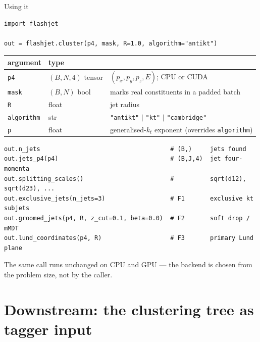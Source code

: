 \documentclass[aspectratio=169,10pt]{beamer}
\newcommand{\smallnote}[1]{{\footnotesize\color{fjgray} #1}}
\begin{document}
\begin{frame}[fragile]{Using it}
\begin{Verbatim}[fontsize=\footnotesize,frame=single,rulecolor=\color{fjgray}]
import flashjet

out = flashjet.cluster(p4, mask, R=1.0, algorithm="antikt")
\end{Verbatim}
\vspace{-0.3em}
{\footnotesize
\begin{tabular}{@{}lll@{}}
\toprule
\textbf{argument} & \textbf{type} & \\
\midrule
\texttt{p4} & $(B,N,4)$ tensor & $(p_x,p_y,p_z,E)$; CPU or CUDA\\
\texttt{mask} & $(B,N)$ bool & marks real constituents in a padded batch\\
\texttt{R} & float & jet radius\\
\texttt{algorithm} & str & \texttt{"antikt"} $\vert$ \texttt{"kt"} $\vert$ \texttt{"cambridge"}\\
\texttt{p} & float & generalised-$k_t$ exponent (overrides \texttt{algorithm})\\
\bottomrule
\end{tabular}}
\medskip

\begin{Verbatim}[fontsize=\footnotesize,frame=single,rulecolor=\color{fjgray}]
out.n_jets                                    # (B,)     jets found
out.jets_p4(p4)                               # (B,J,4)  jet four-momenta
out.splitting_scales()                        #          sqrt(d12), sqrt(d23), ...
out.exclusive_jets(n_jets=3)                  # F1       exclusive kt subjets
out.groomed_jets(p4, R, z_cut=0.1, beta=0.0)  # F2       soft drop / mMDT
out.lund_coordinates(p4, R)                   # F3       primary Lund plane
\end{Verbatim}
\smallnote{The same call runs unchanged on CPU and GPU --- the backend is chosen
from the problem size, not by the caller.}
\end{frame}

\section{Downstream: the clustering tree as tagger input}
\end{document}
